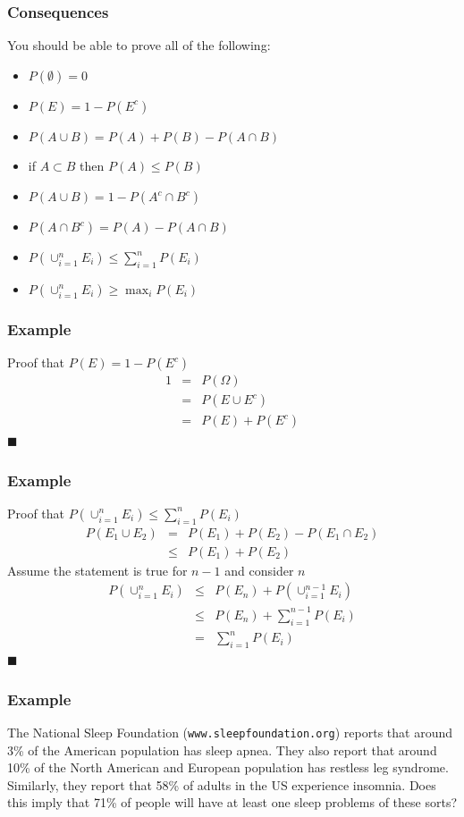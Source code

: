 \documentclass{beamer}
\begin{document}
\begin{frame}
\frametitle{Consequences} 
You should be able to prove all of the following:
\begin{itemize}
\item $P(\emptyset) = 0$
\item $P(E) = 1 - P(E^c)$
\item $P(A \cup B) = P(A) + P(B) - P(A \cap B)$
\item if $A \subset B$ then $P(A) \leq P(B)$
\item $P\left(A \cup B\right) = 1 - P(A^c \cap B^c)$
\item $P(A \cap B^c) = P(A) - P(A \cap B)$
\item $P(\cup_{i=1}^n E_i) \leq \sum_{i=1}^n P(E_i)$
\item $P(\cup_{i=1}^n E_i) \geq \max_i P(E_i)$
\end{itemize}
\end{frame}

\begin{frame}
\frametitle{Example} 
Proof that $P(E) = 1 - P(E^c)$
\begin{eqnarray*}
1 & = & P(\Omega) \\
  & = & P(E \cup E^c)\\
  & = & P(E) + P(E^c)
\end{eqnarray*}
$\blacksquare$
\end{frame}

\begin{frame}
\frametitle{Example}
Proof that $P(\cup_{i=1}^n E_i) \leq \sum_{i=1}^n P(E_i)$\\
\begin{eqnarray*}
  P(E_1 \cup E_2) & =   & P(E_1) + P(E_2) - P(E_1 \cap E_2) \\
                  &\leq & P(E_1) + P(E_2)
\end{eqnarray*}
Assume the statement is true for $n-1$ and consider $n$
\begin{eqnarray*}
  P(\cup_{i=1}^n E_i) & \leq & P(E_n) + P(\cup_{i=1}^{n-1} E_i) \\
                      & \leq & P(E_n) + \sum_{i=1}^{n-1} P(E_i) \\
                      & =    & \sum_{i=1}^n P(E_i)
\end{eqnarray*}
$\blacksquare$
\end{frame}


\begin{frame}
\frametitle{Example} 
  The National Sleep Foundation (\texttt{www.sleepfoundation.org})
  reports that around 3\% of the American population has sleep
  apnea.  They also report that around 10\% of the North American
  and European population has restless leg syndrome. Similarly, they
  report that 58\% of adults in the US experience insomnia.  Does
  this imply that 71\% of people will have at least one sleep
  problems of these sorts?
\end{frame}
\end{document}
